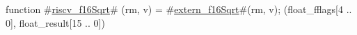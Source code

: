 function #\hyperref[sailRISCVzriscvzyf16Sqrt]{riscv\_f16Sqrt}# (rm, v) = {
  #\hyperref[sailRISCVzexternzyf16Sqrt]{extern\_f16Sqrt}#(rm, v);
  (float_fflags[4 .. 0], float_result[15 .. 0])
}

